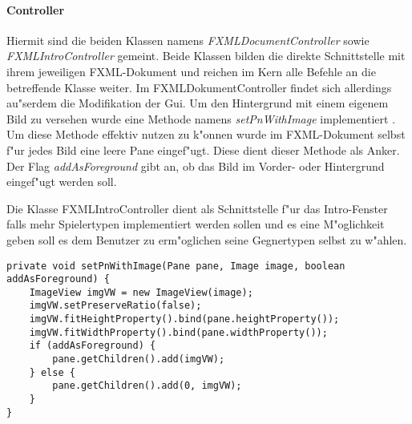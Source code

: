 \paragraph{Controller}
\label{par:controller}
Hiermit sind die beiden Klassen namens \emph{FXMLDocumentController} sowie \emph{FXMLIntroController} gemeint. Beide Klassen bilden die direkte Schnittstelle mit ihrem jeweiligen FXML-Dokument und reichen im Kern alle Befehle an die betreffende Klasse weiter. Im FXMLDokumentController findet sich allerdings au"serdem die Modifikation der Gui. Um den Hintergrund mit einem eigenem Bild zu versehen wurde eine Methode namens \emph{setPnWithImage} implementiert . Um diese Methode effektiv nutzen zu k"onnen wurde im FXML-Dokument selbst f"ur jedes Bild eine leere Pane eingef"ugt. Diese dient dieser Methode als Anker. Der Flag \emph{addAsForeground} gibt an, ob das Bild im Vorder- oder Hintergrund eingef"ugt werden soll. 

Die Klasse FXMLIntroController dient als Schnittstelle f"ur das Intro-Fenster falls mehr Spielertypen implementiert werden sollen und es eine M"oglichkeit geben soll es dem Benutzer zu erm"oglichen seine Gegnertypen selbst zu w"ahlen. 

\begin{lstlisting}[float,style=CodeHighlighting,caption=FXMLDocumentController - setPnWithImage,label=lst:fxmlDocumentController_setPnWithImage]
private void setPnWithImage(Pane pane, Image image, boolean addAsForeground) {
    ImageView imgVW = new ImageView(image);
    imgVW.setPreserveRatio(false);
    imgVW.fitHeightProperty().bind(pane.heightProperty());
    imgVW.fitWidthProperty().bind(pane.widthProperty());
    if (addAsForeground) {
        pane.getChildren().add(imgVW);
    } else {
        pane.getChildren().add(0, imgVW);
    }
}
\end{lstlisting}